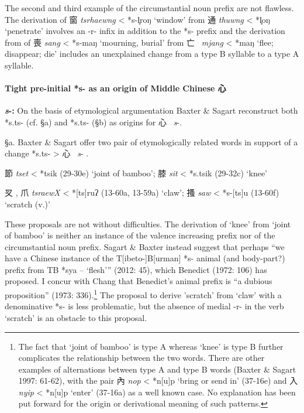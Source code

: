 The second and third example of the circumstantial noun prefix are not
flawless. The derivation of 窗  \emph{tsrhaewng} \textless{} *s-l̥{}roŋ
`window' from 通  \emph{thuwng} \textless{} *l̥{}oŋ `penetrate' involves an
-r- infix in addition to the *s- prefix and the derivation from of 喪
 \emph{sang} \textless{} *s-m{}aŋ `mourning, burial' from 亡~ \emph{mjang}
\textless{} *maŋ `flee; disappear; die' includes an unexplained change
from a type B syllable to a type A syllable.

\paragraph{Tight pre-initial *s- as an origin
of Middle Chinese 心~} \emph{\textbf{s}}\textbf{-}\textbf{:} On
the basis of etymological argumentation Baxter \& Sagart reconstruct
both *s.ts- (cf. §a) and *s.ts{}{}- (§b) as origins for 心~ \emph{s}-.

§a. Baxter \& Sagart offer two pair of etymologically related words in
support of a change *s.ts- \textgreater{} 心~ \emph{s}- 
\citeyearpar[136]{Baxter2014OldChinese}.

\begin{description} \item
節 \emph{tset} \textless{} *ts{}ik (29-30e) `joint of bamboo'; 膝
 \emph{sit} \textless{} *s.tsik (29-32c) `knee'
 \item
㕚 , 爪  \emph{tsraewX} \textless{} *[ts]{}ruʔ (13-60a, 13-59a)
`claw'; 搔  \emph{saw} \textless{} *s-{[}ts]{}u (13-60f) `scratch (v.)'
\end{description}

These proposals are not without difficulties. The derivation of `knee'
from `joint of bamboo' is neither an instance of the valence increasing
prefix nor of the circumstantial noun prefix. Sagart \& Baxter instead
suggest that perhaps ``we have a Chinese instance of the
T{[}ibeto-]B{[}urman] *s- animal (and body-part?) prefix from TB
*sya -- `flesh''' (2012: 45), which Benedict (1972: 106) has proposed. I
concur with Chang that Benedict's animal prefix is ``a dubious
proposition'' (1973: 336).\footnote{The fact that `joint of bamboo' is
  type A whereas `knee' is type B further complicates the relationship
  between the two words. There are other examples of alternations
  between type A and type B words (Baxter \& Sagart 1997: 61-62), with
  the pair 內 \emph{nop} \textless{} *n{}{[}u]p `bring or send in'
  (37-16e) and 入 \emph{nyip} \textless{} *n{[}u]p `enter' (37-16a) as
  a well known case. No explanation has been put forward for the origin
  or derivational meaning of such patterns.} The proposal to derive
'scratch' from `claw' with a denominative *s- is less problematic, but
the absence of medial -r- in the verb `scratch' is an obstacle to this
proposal.

